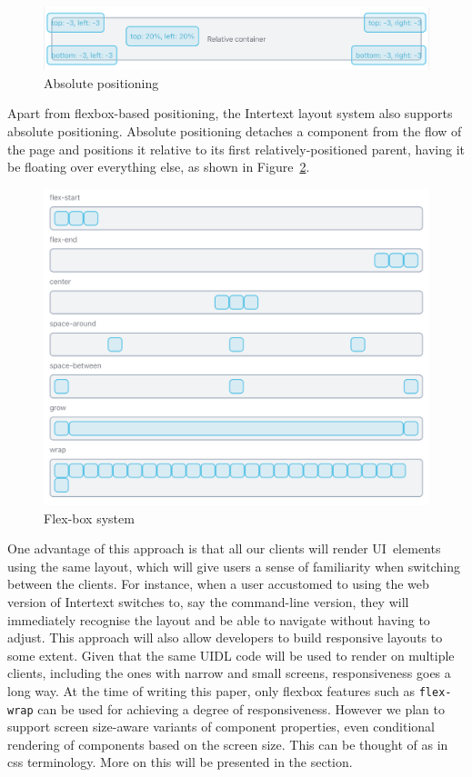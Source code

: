 \begin{figure}[H]
  \centering
  \includegraphics[width=13cm]{thesis/paper/images/absolute.png}
  \caption{Absolute positioning}%
  \label{fig:flexbox_props}%
\end{figure}

Apart from flexbox-based positioning, the Intertext layout system also supports absolute positioning. Absolute positioning detaches a component from the flow of the page and positions it relative to its first relatively-positioned parent, having it be floating over everything else, as shown in Figure~\ref{fig:absolute_positioning}.

\begin{figure}[htb]
  \centering
  \includegraphics[width=13cm]{thesis/paper/images/responsive.png}
  \caption{Flex-box system}%
  \label{fig:absolute_positioning}%
\end{figure}

One advantage of this approach is that all our clients will render UI~elements using the same layout, which will give users a sense of familiarity when switching between the clients. For instance, when a user accustomed to using the web version of Intertext switches to, say the command-line version, they will immediately recognise the layout and be able to navigate without having to adjust. This approach will also allow developers to build responsive layouts to some extent. Given that the same UIDL code will be used to render on multiple clients, including the ones with narrow and small screens, responsiveness goes a long way. At the time of writing this paper, only flexbox features such as \texttt{flex-wrap} can be used for achieving a degree of responsiveness. However we plan to support screen size-aware variants of component properties, even conditional rendering of components based on the screen size. This can be thought of as  in css terminology. More on this will be presented in the  section.

